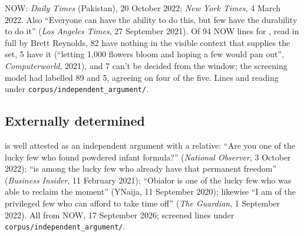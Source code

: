\documentclass[12pt]{article}
\begin{document}
NOW: \textit{Daily Times} (Pakistan), 20 October 2022; \textit{New York Times}, 4 March 2022. Also \enquote{Everyone can have the ability to do this, but few have the durability to do it} (\textit{Los Angeles Times}, 27 September 2021). Of 94 NOW lines for , read in full by Brett Reynolds, 82 have nothing in the visible context that supplies the set, 5 have it (\enquote{letting 1,000 flowers bloom and hoping a few would pan out}, \textit{Computerworld}, 2021), and 7 can't be decided from the window; the screening model had labelled 89 and 5, agreeing on four of the five. Lines and reading under \texttt{corpus/independent\_argument/}.

\subsection{Externally determined }

 is well attested as an independent argument with a relative: \enquote{Are you one of the lucky few who found powdered infant formula?} (\textit{National Observer}, 3 October 2022); \enquote{is among the lucky few who already have that permanent freedom} (\textit{Business Insider}, 11 February 2021); \enquote{Obialor is one of the lucky few who was able to reclaim the moment} (YNaija, 11 September 2020); likewise \enquote{I am of the privileged few who can afford to take time off} (\textit{The Guardian}, 1 September 2022). All from NOW, 17 September 2026; screened lines under \texttt{corpus/independent\_argument/}.

\printbibliography
\end{document}
